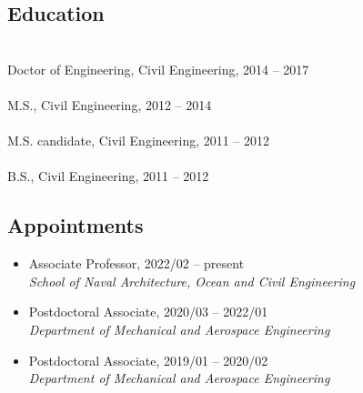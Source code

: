 \documentclass[10pt]{article}
\newenvironment{myitemize}
{ \begin{itemize}
    \setlength{\itemsep}{0pt}
    \setlength{\parskip}{0pt}
    \setlength{\parsep}{0pt}     }
{ \end{itemize}                  }
\begin{document}
\subsection*{Education}

	\\		
\indent Doctor of Engineering, Civil Engineering, 2014 -- 2017  \\

\\
\indent M.S., Civil Engineering, 2012 -- 2014\\

\\
\indent M.S. candidate, Civil Engineering, 2011 -- 2012\\

\\
\indent B.S., Civil Engineering, 2011 -- 2012\\

\subsection*{Appointments}

\begin{myitemize}
\item Associate Professor, 2022/02 -- present \\
{\em School of Naval Architecture, Ocean and Civil Engineering}
\end{myitemize}

\begin{myitemize}
\item  Postdoctoral Associate, 2020/03 -- 2022/01\\
{\em Department of Mechanical and Aerospace Engineering}
\end{myitemize}

\begin{myitemize}
\item  Postdoctoral Associate, 2019/01 -- 2020/02\\
{\em Department of Mechanical and Aerospace Engineering}
\end{myitemize}
\end{document}
